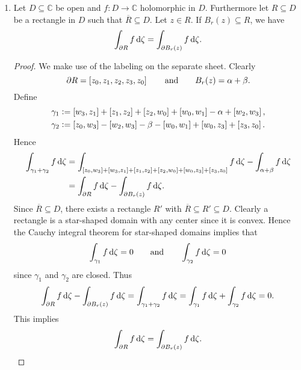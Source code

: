 \begin{enumerate}[label = \textbf{Exercise \arabic*.},wide = 0pt, itemsep=1.5ex]
	\item 
		\begin{proposition}
			Let $D \subseteq \mathbb{C}$ be open and $f: D \to \mathbb{C}$ holomorphic in $D$. Furthermore let $R \subseteq D$ be a rectangle in $D$ such that $\overline{R} \subseteq D$. Let $z \in R$. If $B_r(z) \subseteq R$, we have 
			\begin{equation}
				\int_{\partial R} f\mathop{}\!\mathrm{d} \zeta = \int_{\partial B_r(z)} f\mathop{}\!\mathrm{d} \zeta.
			\end{equation}	
			\label{prop:zentrierungslemma}
		\end{proposition}

		\begin{proof}
			We make use of the labeling on the separate sheet. Clearly
			\begin{equation}
				\partial R = \sbr[0]{z_0,z_1,z_2,z_3,z_0} \qquad \text{and} \qquad 	B_r(z) = \alpha + \beta.
			\end{equation}
			Define
			\begin{align*}
				\gamma_1 &:= \intcc{w_3,z_1} + \intcc{z_1,z_2} + \intcc{z_2,w_0} + \intcc{w_0,w_1} -\alpha + \intcc{w_2,w_3},\\ 
				\gamma_2 &:= \intcc{z_0,w_3} - \intcc{w_2,w_3} - \beta - \intcc{w_0,w_1} + \intcc{w_0,z_3} + \intcc{z_3,z_0}.
			\end{align*}
			Hence
			\begin{align*}
				\int_{\gamma_1 + \gamma_2} f \d \zeta &= \int_{\intcc{z_0,w_3} + \intcc{w_3,z_1} + \intcc{z_1,z_2} + \intcc{z_2,w_0} + \intcc{w_0,z_3} + \intcc{z_3,z_0}}f\d \zeta - \int_{\alpha + \beta}f\d \zeta\\
				&= \int_{\partial R}f\d \zeta - \int_{\partial B_r(z)} f \d\zeta.
			\end{align*}
			Since $\overline{R} \subseteq D$, there exists a rectangle $R'$ with $\overline{R} \subseteq R' \subseteq D$. Clearly a rectangle is a star-shaped domain with any center since it is convex. Hence the Cauchy integral theorem for star-shaped domains implies that
			\begin{equation}
				\int_{\gamma_1} f \mathop{}\!\mathrm{d} \zeta = 0 \qquad \text{and} \qquad \int_{\gamma_2} f \mathop{}\!\mathrm{d} \zeta = 0
			\end{equation}
			\noindent since $\gamma_1$ and $\gamma_2$ are closed. Thus
			\begin{equation}
				\int_{\partial R}f\mathop{}\!\mathrm{d} \zeta - \int_{\partial B_r(z)} f \mathop{}\!\mathrm{d}\zeta = \int_{\gamma_1 + \gamma_2} f \mathop{}\!\mathrm{d} \zeta = \int_{\gamma_1} f \mathop{}\!\mathrm{d} \zeta + \int_{\gamma_2} f \mathop{}\!\mathrm{d} \zeta = 0. 
			\end{equation}
			This implies
			\begin{equation}
				\int_{\partial R}f\mathop{}\!\mathrm{d} \zeta = \int_{\partial B_r(z)} f \mathop{}\!\mathrm{d}\zeta.
			\end{equation}
		\end{proof}


\end{enumerate}

